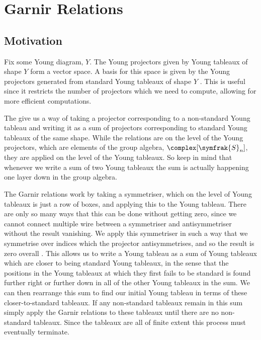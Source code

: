\documentclass[fleqn]{NotesClass}
\newcommand{\symmetricGroup}[1][n]{\symfrak{S}_{#1}}
\begin{document}
    \section{Garnir Relations}
    \subsection{Motivation}
    Fix some Young diagram, \(Y\).
    The Young projectors given by Young tableaux of shape \(Y\) form a vector space.
    A basis for this space is given by the Young projectors generated from standard Young tableaux of shape \(Y\) \cite[70]{sagan}.
    This is useful since it restricts the number of projectors which we need to compute, allowing for more efficient computations.
    
    The  give us a way of taking a projector corresponding to a non-standard Young tableau and writing it as a sum of projectors corresponding to standard Young tableaux of the same shape.
    While the relations are on the level of the Young projectors, which are elements of the group algebra, \(\complex[\symmetricGroup]\), they are applied on the level of the Young tableaux.
    So keep in mind that whenever we write a sum of two Young tableaux the sum is actually happening one layer down in the group algebra.
    
    The Garnir relations work by taking a symmetriser, which on the level of Young tableaux is just a row of boxes, and applying this to the Young tableau.
    There are only so many ways that this can be done without getting zero, since we cannot connect multiple wire between a symmetriser and antisymmetriser without the result vanishing.
    We apply this symmetriser in such a way that we symmetrise over indices which the projector antisymmetrises, and so the result is zero overall \cite[27]{james}.
    This allows us to write a Young tableau as a sum of Young tableaux which are closer to being standard Young tableaux, in the sense that the positions in the Young tableaux at which they first fails to be standard is found further right or further down in all of the other Young tableaux in the sum.
    We can then rearrange this sum to find our initial Young tableau in terms of these closer-to-standard tableaux.
    If any non-standard tableaux remain in this sum simply apply the Garnir relations to these tableaux until there are no non-standard tableaux.
    Since the tableaux are all of finite extent this process must eventually terminate.
    
\end{document}

